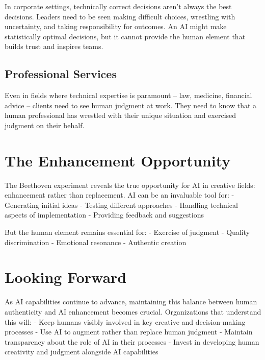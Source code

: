 \documentclass[
  Letterpaper,
]{scrbook}
\begin{document}
In corporate settings, technically correct decisions aren't always the
best decisions. Leaders need to be seen making difficult choices,
wrestling with uncertainty, and taking responsibility for outcomes. An
AI might make statistically optimal decisions, but it cannot provide the
human element that builds trust and inspires teams.

\subsection{Professional Services}\label{professional-services}

Even in fields where technical expertise is paramount -- law,
medicine, financial advice -- clients need to see human judgment at
work. They need to know that a human professional has wrestled with
their unique situation and exercised judgment on their behalf.

\section{\texorpdfstring{The
Enhancement
Opportunity}{The Enhancement Opportunity}}\label{the-enhancement-opportunity}

The Beethoven experiment reveals the true opportunity for AI in creative
fields: enhancement rather than replacement. AI can be an invaluable
tool for: - Generating initial ideas - Testing different approaches -
Handling technical aspects of implementation - Providing feedback and
suggestions

But the human element remains essential for: - Exercise of judgment -
Quality discrimination - Emotional resonance - Authentic creation

\section{Looking Forward}\label{looking-forward}

As AI capabilities continue to advance, maintaining this balance between
human authenticity and AI enhancement becomes crucial. Organizations
that understand this will: - Keep humans visibly involved in key
creative and decision-making
processes - Use AI to augment rather than replace human judgment -
Maintain transparency about the role
of AI in their processes - Invest in developing human creativity and
judgment alongside AI capabilities
\end{document}
